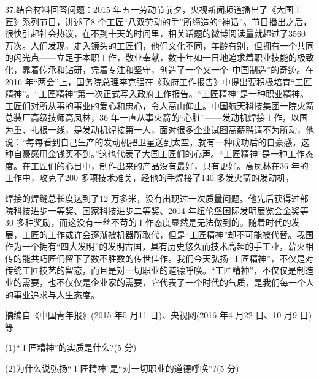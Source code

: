 \documentclass[UTF8,11pt]{ctexart}
\begin{document}
37.结合材料回答问题：2015 年五一劳动节前夕，央视新闻频道播出了《大国工匠》系列节目，讲述了8 个工匠“八双劳动的手”所缔造的“神话”。节目播出之后，很快引起社会热议，在不到十天的时间里，相关话题的微博阅读量就超过了3560 万次。人们发现，走入镜头的工匠们，他们文化不同，年龄有别，但拥有一个共同的闪光点——立足于本职工作，敬业奉献，数十年如一日地追求着职业技能的极致化，靠着传承和钻研，凭着专注和坚守，创造了一个又一个“中国制造”的奇迹。在2016 年“两会”上，国务院总理李克强在《政府工作报告》中提出要积极培育“工匠精神”。“工匠精神”第一次正式写入政府工作报告。“工匠精神”是一种职业精神。工匠们对所从事的事业的爱心和忠心，令人高山仰止。中国航天科技集团一院火箭总装厂高级技师高凤林，36 年一直从事火箭的“心脏”——发动机焊接工作，以国为重、扎根一线，是发动机焊接第一人，面对很多企业试图高薪聘请不为所动，他说：“每每看到自己生产的发动机把卫星送到太空，就有一种成功后的自豪感，这种自豪感用金钱买不到。”这也代表了大国工匠们的心声。“工匠精神”是一种工作态度。在工匠们的心目中，制作出来的产品没有最好，只有更好。高凤林在36 年的工作中，攻克了200 多项技术难关，经他的手焊接了140 多发火箭的发动机，


焊接的焊缝总长度达到了12 万多米，没有出现过一次质量问题。他先后获得过部院科技进步一等奖、国家科技进步二等奖、2014 年纽伦堡国际发明展览会金奖等30 多种奖励，而这没有一丝不苟的工作态度显然是无法做到的。随着时代的发展，工匠的工作或许会逐渐被机器所取代，但是“工匠精神”却不可能被代替。我国作为一个拥有“四大发明”的发明古国，具有历史悠久而技术高超的手工业，薪火相传的能共巧匠们留下了数不胜数的传世佳作。我们今天弘扬“工匠精神”，不仅是对传统工匠技艺的留恋，而且是对一切职业的道德呼唤。“工匠精神”，不仅仅是制造业的需要，也不仅仅是企业家的需要，它代表了一个时代的气质，是我们每一个人的事业追求与人生态度。

摘编自《中国青年报》(2015 年5 月11 日)、央视网(2016 年4 月22 日、10 月9 日)等

(1)“工匠精神”的实质是什么?(5 分)


(2)为什么说弘扬“工匠精神”是“对一切职业的道德呼唤”?(5 分)
\end{document}
